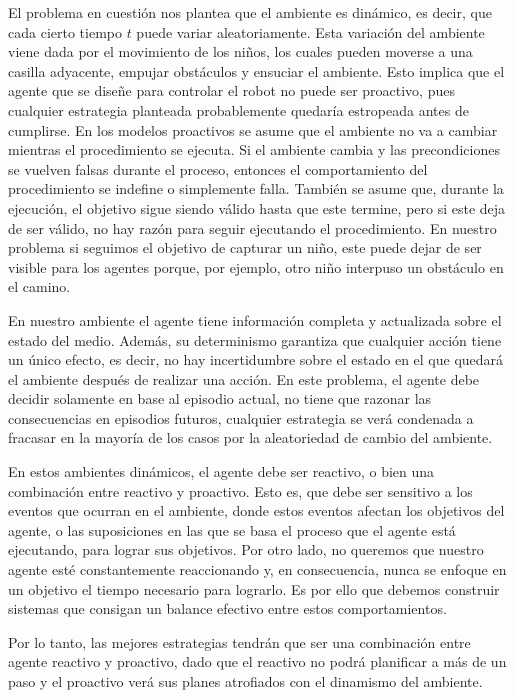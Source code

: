 \documentclass[twoside]{article}
\begin{document}
El problema en cuesti\'on nos plantea que el ambiente es din\'amico, es decir, que cada cierto tiempo $t$ puede variar aleatoriamente. Esta variaci\'on del ambiente viene dada por el movimiento de los ni\~nos, los cuales pueden moverse a una casilla adyacente, empujar obst\'aculos y ensuciar el ambiente. Esto implica que el agente que se dise\~ne para controlar el robot no puede ser proactivo, pues cualquier estrategia planteada probablemente quedar\'ia estropeada antes de cumplirse. En los modelos proactivos se asume que el ambiente no va a cambiar mientras el procedimiento se ejecuta. Si el ambiente cambia y las precondiciones se vuelven falsas durante el proceso, entonces el comportamiento del procedimiento se indefine o simplemente falla. Tambi\'en se asume que, durante la ejecuci\'on, el objetivo sigue siendo v\'alido hasta que este termine, pero si este deja de ser v\'alido, no hay raz\'on para seguir ejecutando el procedimiento. En nuestro problema si seguimos el objetivo de capturar un ni\~no, este puede dejar de ser visible para los agentes porque, por ejemplo, otro ni\~no interpuso un obst\'aculo en el camino.

En nuestro ambiente el agente tiene informaci\'on completa y actualizada sobre el estado del medio. Adem\'as, su determinismo garantiza que cualquier acci\'on tiene un \'unico efecto, es decir, no hay incertidumbre sobre el estado en el que quedar\'a el ambiente despu\'es de realizar una acci\'on. En este problema, el agente debe decidir solamente en base al episodio actual, no tiene que razonar las consecuencias en episodios futuros, cualquier estrategia se ver\'a condenada a fracasar en la mayor\'ia de los casos por la aleatoriedad de cambio del ambiente.

En estos ambientes din\'amicos, el agente debe ser reactivo, o bien una combinaci\'on entre reactivo y proactivo. Esto es, que debe ser sensitivo a los eventos que ocurran en el ambiente, donde estos eventos afectan los objetivos del agente, o las suposiciones en las que se basa el proceso que el agente est\'a ejecutando, para lograr sus objetivos. Por otro lado, no queremos que nuestro agente est\'e constantemente reaccionando y, en consecuencia, nunca se enfoque en un objetivo el tiempo necesario para lograrlo. Es por ello que debemos construir sistemas que consigan un balance efectivo entre estos comportamientos.

Por lo tanto, las mejores estrategias tendr\'an que ser una combinaci\'on entre agente reactivo y proactivo, dado que el reactivo no podr\'a planificar a m\'as de un paso y el proactivo ver\'a sus planes atrofiados con el dinamismo del ambiente. 
\end{document}
